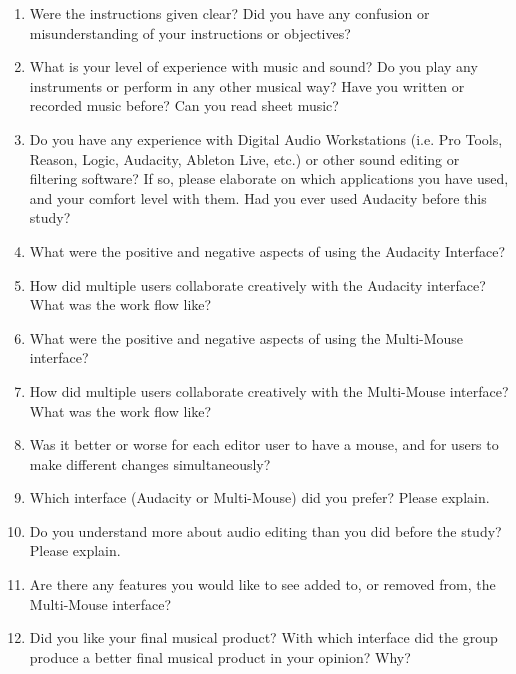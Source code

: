 \documentclass[10pt]{article}
\begin{document}
\begin{enumerate}

\item Were the instructions given clear?  Did you have any confusion or 
misunderstanding of your instructions or objectives?

\item What is your level of experience with music and sound? Do you play any 
instruments or perform in any other musical way? 
Have you written or recorded music before? Can you read sheet music?

\item Do you have any experience with Digital Audio Workstations 
(i.e. Pro Tools, Reason, Logic, Audacity, Ableton Live, etc.) 
or other sound editing or filtering software? If so, please 
elaborate on which applications you have used, and your comfort level with them.
Had you ever used Audacity before this study?

\item What were the positive and negative aspects of using the Audacity Interface? 

\item How did multiple users collaborate creatively with the Audacity
interface? What was the work flow like?

\item What were the positive and negative aspects of using the Multi-Mouse interface? 

\item How did multiple users collaborate creatively with
the Multi-Mouse interface? What was the work flow like? 

\item Was it better or worse for each editor user to have a mouse, 
and for users to make different changes simultaneously?

\item Which interface (Audacity or Multi-Mouse) did you prefer? Please explain.

\item Do you understand more about audio editing than you did before the study? Please explain.

\item Are there any features you would like to see added to, or removed from,
the Multi-Mouse interface?

\item Did you like your final musical product? With which interface did the group 
produce a better final musical product in your opinion? Why?

\end{enumerate}
\end{document}
